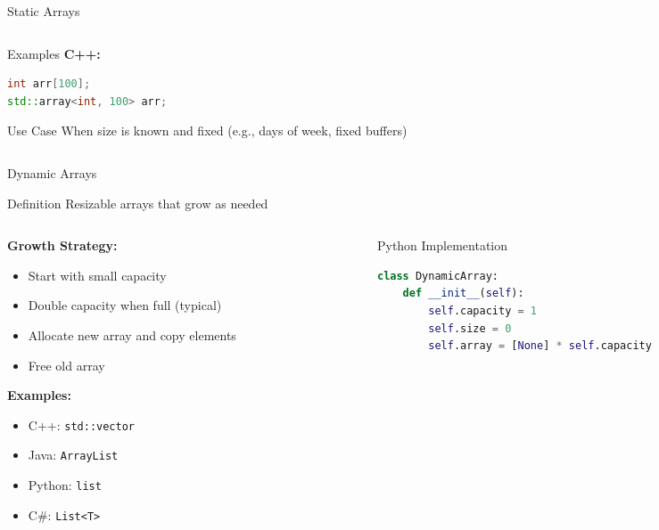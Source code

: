 \documentclass[aspectratio=169,xcolor=dvipsnames]{beamer}
\begin{document}
\begin{frame}[fragile]{Static Arrays}
\begin{columns}
\begin{column}{0.48\textwidth}
\begin{exampleblock}{Examples}
        \textbf{C++:}
        \begin{lstlisting}[language=C++,basicstyle=\tiny\ttfamily]
int arr[100];
std::array<int, 100> arr;
        \end{lstlisting}
      \end{exampleblock}

      \vspace{0.2cm}

      \begin{alertblock}{Use Case}
        When size is known and fixed (e.g., days of week, fixed buffers)
      \end{alertblock}
    \end{column}
  \end{columns}
\end{frame}

\begin{frame}[fragile]{Dynamic Arrays}
  \begin{block}{Definition}
    Resizable arrays that grow as needed
  \end{block}

  \begin{columns}
    \begin{column}{0.55\textwidth}
      \textbf{Growth Strategy:}
      \begin{itemize}
        \item Start with small capacity
        \item Double capacity when full (typical)
        \item Allocate new array and copy elements
        \item Free old array
      \end{itemize}

      \vspace{0.3cm}

      \textbf{Examples:}
      \begin{itemize}
        \item C++: \texttt{std::vector}
        \item Java: \texttt{ArrayList}
        \item Python: \texttt{list}
        \item C\#: \texttt{List<T>}
      \end{itemize}
    \end{column}
    \begin{column}{0.4\textwidth}
      \begin{exampleblock}{Python Implementation}
        \begin{lstlisting}[language=Python,basicstyle=\tiny\ttfamily]
class DynamicArray:
    def __init__(self):
        self.capacity = 1
        self.size = 0
        self.array = [None] * self.capacity


\end{lstlisting}
\end{exampleblock}
\end{column}
\end{columns}
\end{frame}
\end{document}
